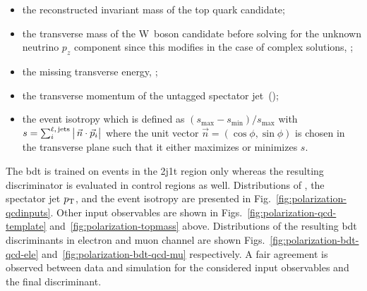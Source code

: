 \begin{itemize}
\item the reconstructed invariant mass of the top quark candidate;
\item the transverse mass of the W~boson candidate before solving for the unknown neutrino $p_{z}$ component since this modifies \pvmiss in the case of complex solutions, \mtw;
\item the missing transverse energy, \met;
\item the transverse momentum of the untagged spectator jet~(\jprime);
\item the event isotropy which is defined as $(s_\mathrm{max}-s_\mathrm{min})/s_\mathrm{max}$ with $s=\sum_{i}^\scriptn{\ell,\,\mathrm{jets}}\big|\,\vec{n}\cdot\vec{p}_{i}\big|$ where the unit vector $\vec{n}=(\cos\phi,\sin\phi)$ is chosen in the transverse plane such that it either maximizes or minimizes $s$.
\end{itemize}

The \gls{bdt} is trained on events in the 2j1t region only whereas the resulting discriminator is evaluated in control regions as well. Distributions of \mtw, the spectator jet $p_\mathrm{T}$, and the event isotropy are presented in Fig.~\ref{fig:polarization-qcdinputs}. Other input observables are shown in Figs.~\ref{fig:polarization-qcd-template} and~\ref{fig:polarization-topmass} above. Distributions of the resulting \gls{bdt} discriminants in electron and muon channel are shown Figs.~\ref{fig:polarization-bdt-qcd-ele} and~\ref{fig:polarization-bdt-qcd-mu} respectively. A fair agreement is observed between data and simulation for the considered input observables and the final discriminant.


